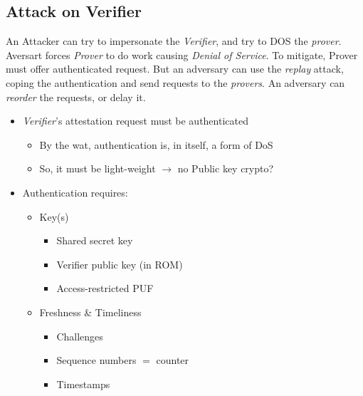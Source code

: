 \subsection{Attack on Verifier}

An Attacker can try to impersonate the \textit{Verifier}, and try to DOS the 
\textit{prover}. Aversart forces \textit{Prover} to do work causing \textit{Denial of 
Service}. To mitigate, Prover must offer authenticated request. But an 
adversary can use the \textit{replay} attack, coping the authentication and 
send requests to the \textit{provers}. An adversary can \textit{reorder} the 
requests, or delay it.
\begin{itemize}
	\item \textit{Verifier}'s attestation request must be authenticated
	\begin{itemize}
		\item By the wat, authentication is, in itself, a form of DoS
		\item So, it must be light-weight $\to$ no Public key crypto?
	\end{itemize}
\end{itemize}
\begin{itemize}
	\item Authentication requires:
	\begin{itemize}
		\item Key(s)
		\begin{itemize}
			\item Shared secret key
			\item Verifier public key (in ROM)
			\item Access-restricted PUF
		\end{itemize}
		\item Freshness \& Timeliness
		\begin{itemize}
			\item Challenges
			\item Sequence numbers $=$ counter
			\item Timestamps
		\end{itemize}
	\end{itemize}
\end{itemize}